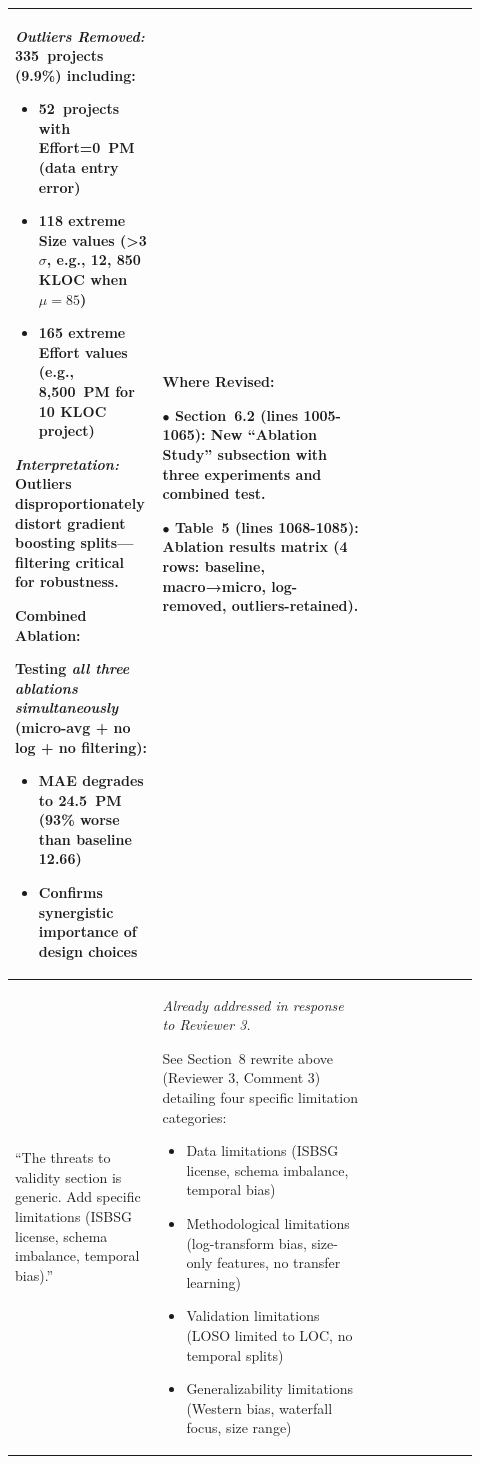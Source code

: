 \documentclass[11pt,a4paper]{article}
\begin{document}
\begin{longtable}{>{\raggedright\arraybackslash}p{0.26\linewidth}|>{\raggedright\arraybackslash}p{0.44\linewidth}|>{\raggedright\arraybackslash}p{0.22\linewidth}}
\textit{Outliers Removed:} 335~projects (9.9\%) including:
\begin{itemize}
    \item 52~projects with Effort=0~PM (data entry error)
    \item 118 extreme Size values (>3$\sigma$, e.g., 12, 850 KLOC when $\mu=85$)
    \item 165 extreme Effort values (e.g., 8,500~PM for 10 KLOC project)
\end{itemize}

\textit{Interpretation:} Outliers disproportionately distort gradient boosting splits---filtering critical for robustness.

\textbf{Combined Ablation:}

Testing \textit{all three ablations simultaneously} (micro-avg + no log + no filtering):
\begin{itemize}
    \item \textbf{MAE degrades to 24.5~PM} (93\% worse than baseline 12.66)
    \item Confirms synergistic importance of design choices
\end{itemize} &

\textbf{Where Revised:}

$\bullet$ \textbf{Section~6.2} (lines 1005-1065): New ``Ablation Study'' subsection with three experiments and combined test.

$\bullet$ \textbf{Table~5} (lines 1068-1085): Ablation results matrix (4 rows: baseline, macro→micro, log-removed, outliers-retained). \\

\midrule

``The threats to validity section is generic. Add specific limitations (ISBSG license, schema imbalance, temporal bias).'' &

\textit{Already addressed in response to Reviewer 3.}

See Section~8 rewrite above (Reviewer 3, Comment 3) detailing four specific limitation categories:
\begin{itemize}
    \item Data limitations (ISBSG license, schema imbalance, temporal bias)
    \item Methodological limitations (log-transform bias, size-only features, no transfer learning)
    \item Validation limitations (LOSO limited to LOC, no temporal splits)
    \item Generalizability limitations (Western bias, waterfall focus, size range)
\end{itemize} &


\end{longtable}
\end{document}
